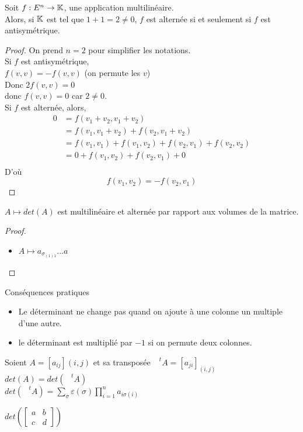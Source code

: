 \documentclass[../main.tex]{subfile}
\begin{document}
\begin{prop}
	Soit $f:E^n \to \mathbb{K}$, une application multilinéaire.\\
	Alors, si $\mathbb{K}$ est tel que $1 + 1 = 2 \neq 0$, 
	$f$ est alternée si et seulement si $f$ est antisymétrique.
\end{prop}

\begin{proof}
	On prend $n = 2$ pour simplifier les notations.\\
	Si $f$ est antisymétrique, \\
	$f(v, v) = -f(v, v)$ (on permute les $v$)\\
	Donc $2f(v,v) = 0$\\
	donc $f(v,v) = 0$ car $2 \neq 0$.\\

	Si $f$ est alternée, alors,
	$$
\begin{aligned}
	0 &= f(v_1 + v_2, v_1 + v_2)\\
	&= f(v_1, v_1 + v_2) + f(v_2, v_1 + v_2)\\
	&= f(v_1, v_1) + f(v_1, v_2) + f(v_2, v_1) + f(v_2, v_2)\\
	&= 0 + f(v_1, v_2) + f(v_2, v_1) + 0\\
\end{aligned}
	$$
	D'où 
	$$f(v_1, v_2) = -f(v_2, v_1)$$
\end{proof}

\begin{theo}
	$A \mapsto det(A)$ est multilinéaire et alternée par rapport aux volumes de la matrice.
\end{theo}

\begin{proof}
\begin{itemize}	
	\item $A \mapsto a_{\sigma_{(1)1}} ... a$
\end{itemize}
\end{proof}

\begin{corrol}{Conséquences pratiques}
\begin{itemize}	
	\item Le déterminant ne change pas quand on ajoute à une colonne un multiple d'une autre.
	\item le déterminant est multiplié par $-1$ si on permute deux colonnes.
\end{itemize}
\end{corrol}

\begin{theo}
	Soient $A = \left[a_{ij}\right]{(i,j)}$ et sa transposée $\phantom{A}^tA = \left[a_{ji}\right]_{(i,j)}$\\
	$det(A) = det(\phantom{A}^tA)$\\
	$det(\phantom{A}^tA) = \sum\limits_\sigma \varepsilon(\sigma) \prod\limits_{i=1}^n a_{i\sigma(i)}$
\end{theo}

\begin{lemme}
	$det \left(
\begin{bmatrix} a & b \\ c & d \end{bmatrix}
	\right)
	$
\end{lemme}
\end{document}
